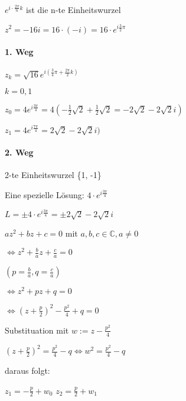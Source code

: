 \documentclass{../tudscript}
\begin{document}
\(e^{i \cdot \frac{2 \pi}{n} k}\) ist die n-te Einheitswurzel

\hypertarget{beispiel-1}{%
\label{beispiel-1}}

\(z^2 = -16 i = 16 \cdot (-i) = 16 \cdot e^{i \frac{3}{2} \pi}\)

\hypertarget{weg}{%
\paragraph{1. Weg}\label{weg}}

\(z_k = \sqrt{16} e^{i (\frac{3}{4} \pi + \frac{2 \pi}{2}k)}\)

\(k = {0,1}\)

\(z_0 = 4 e^{i \frac{3 \pi}{4}} = 4 (- \frac{1}{2} \sqrt{2} + \frac{1}{2} \sqrt{2} = -2 \sqrt{2} - 2 \sqrt{2} i)\)

\(z_1 = 4 e^{i \frac{7 \pi}{4}} = 2 \sqrt{2} - 2 \sqrt{2} i)\)

\hypertarget{weg-1}{%
\paragraph{2. Weg}\label{weg-1}}

2-te Einheitswurzel \{1, -1\}

Eine spezielle Lösung: \(4 \cdot e^{i \frac{3 \pi}{4}}\)

\(L = \pm 4 \cdot e^{i \frac{3 \pi}{4}} = \pm 2 \sqrt{2} - 2 \sqrt{2} i\)

\hypertarget{allgemein}{%
\label{allgemein}}

\(az^2 + bz + c = 0\) mit \(a, b, c \in \mathbb{C}, a \neq 0\)

\(\iff z^2 + \frac{b}{a} z + \frac{c}{a} = 0\)

\((p = \frac{b}{a}, q = \frac{c}{a})\)

\(\iff z^2 + pz + q = 0\)

\(\iff (z + \frac{p}{2})^2 - \frac{p^2}{4} + q = 0\)

Substituation mit \(w := z - \frac{p^2}{4}\)

\((z +\frac{p}{2})^2 = \frac{p^2}{4} - q \iff w^2 = \frac{p^2}{4} - q\)

daraus folgt:

\(z_1 = - \frac{p}{2} + w_0\) \(z_2 = \frac{p}{2} + w_1\)
\end{document}
